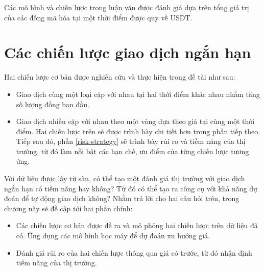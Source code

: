 Các mô hình và chiến lược trong luận văn được đánh giá dựa trên tổng giá trị của các đồng mã hóa tại một thời điểm được quy về USDT.

\section{Các chiến lược giao dịch ngắn hạn}\label{strategy_describing}
Hai chiến lược cơ bản được nghiên cứu và thực hiện trong đề tài như sau:
\begin{itemize}
	\item Giao dịch cùng một loại cặp với nhau tại hai thời điểm khác nhau nhằm tăng số lượng đồng ban đầu.
	\item Giao dịch nhiều cặp với nhau theo một vòng dựa theo giá tại cùng một thời điểm.
	Hai chiến lược trên sẽ được trình bày chi tiết hơn trong phần tiếp theo. Tiếp sau đó, phần \ref{risk-strategy} sẽ trình bày rủi ro và tiềm năng của thị trường, từ đó làm nỗi bật các hạn chế, ưu điểm của từng chiến lược tương ứng.
\end{itemize}
Với dữ liệu được lấy từ sàn, có thể tạo một đánh giá thị trường với giao dịch ngắn hạn có tiềm năng hay không? Từ đó có thể tạo ra công cụ với khả năng dự đoán để tự động giao dịch không?  Nhằm trả lời cho hai câu hỏi trên, trong chương này sẽ đề cập tới hai phần chính:
\begin{itemize}
	\item Các chiến lược cơ bản được đề ra và mô phỏng hai chiến lược trên dữ liệu đã có. Ứng dụng các mô hình học máy để dự đoán xu hướng giá.
	\item  Đánh giá rủi ro của hai chiến lược thông qua giá có trước, từ đó nhận định tiềm năng của thị trường.
\end{itemize}

